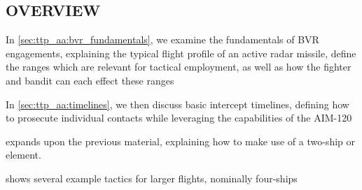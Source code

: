 \clearpage

\subsection{OVERVIEW}
\begin{tcoloritemize}
    \blueitem[Fundamentals] 
    In \cref{sec:ttp_aa:bvr_fundamentals}, 
    we examine the fundamentals of BVR engagements, 
    explaining the typical flight profile of an active radar missile,
    define the ranges which are relevant for tactical employment,
    as well as how the fighter and bandit can each effect these ranges

    In \cref{sec:ttp_aa:timelines}, 
    we then discuss basic intercept timelines, 
    defining how to prosecute individual contacts while leveraging the capabilities of the AIM-120

     expands upon the previous material, 
    explaining how to make use of a two-ship or element.

     shows several example tactics for larger flights, nominally four-ships
\end{tcoloritemize}

\clearpage